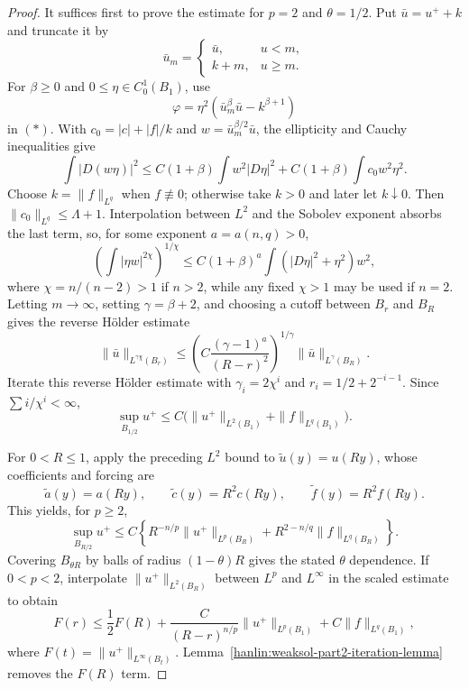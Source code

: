 \begin{proof}
\sketch It suffices first to prove the estimate for $p=2$ and
$\theta=1/2$. Put $\bar u=u^++k$ and truncate it by
\[
\bar u_m=
\begin{cases}
\bar u,&u<m,\\
k+m,&u\geq m.
\end{cases}
\]
For $\beta\geq0$ and $0\leq\eta\in C^1_0(B_1)$, use
\[
\varphi=\eta^2(\bar u_m^\beta\bar u-k^{\beta+1})
\]
in $(*)$. With $c_0=|c|+|f|/k$ and
$w=\bar u_m^{\beta/2}\bar u$, the ellipticity and Cauchy inequalities give
\[
\int|D(w\eta)|^2
\leq C(1+\beta)\int w^2|D\eta|^2
+C(1+\beta)\int c_0w^2\eta^2.
\]
Choose $k=\|f\|_{L^q}$ when $f\not\equiv0$; otherwise take $k>0$ and
later let $k\downarrow0$. Then $\|c_0\|_{L^q}\leq\Lambda+1$.
Interpolation between $L^2$ and the Sobolev exponent absorbs the last term,
so, for some exponent $a=a(n,q)>0$,
\[
\left(\int|\eta w|^{2\chi}\right)^{1/\chi}
\leq C(1+\beta)^a
\int(|D\eta|^2+\eta^2)w^2,
\]
where $\chi=n/(n-2)>1$ if $n>2$, while any fixed $\chi>1$ may be used
if $n=2$. Letting $m\to\infty$, setting $\gamma=\beta+2$, and choosing a
cutoff between $B_r$ and $B_R$ gives the reverse H\"older estimate
\begin{equation}
\|\bar u\|_{L^{\gamma\chi}(B_r)}
\leq\left(C\frac{(\gamma-1)^a}{(R-r)^2}\right)^{1/\gamma}
\|\bar u\|_{L^\gamma(B_R)}.
\end{equation}
Iterate this reverse H\"older estimate with $\gamma_i=2\chi^i$ and
$r_i=1/2+2^{-i-1}$. Since $\sum i/\chi^i<\infty$,
\begin{equation}
\sup_{B_{1/2}}u^+
\leq C\bigl(\|u^+\|_{L^2(B_1)}+\|f\|_{L^q(B_1)}\bigr).
\end{equation}

For $0<R\leq1$, apply the preceding $L^2$ bound to
$\widetilde u(y)=u(Ry)$, whose coefficients and forcing are
\[
\widetilde a(y)=a(Ry),\qquad
\widetilde c(y)=R^2c(Ry),\qquad
\widetilde f(y)=R^2f(Ry).
\]
This yields, for $p\geq2$,
\begin{equation}
\sup_{B_{R/2}}u^+
\leq C\left\{R^{-n/p}\|u^+\|_{L^p(B_R)}
+R^{2-n/q}\|f\|_{L^q(B_R)}\right\}.
\end{equation}
Covering $B_{\theta R}$ by balls of radius $(1-\theta)R$ gives the stated
$\theta$ dependence. If $0<p<2$, interpolate
$\|u^+\|_{L^2(B_R)}$ between $L^p$ and $L^\infty$ in the scaled estimate
to obtain
\[
F(r)\leq\frac12F(R)
+\frac{C}{(R-r)^{n/p}}\|u^+\|_{L^p(B_1)}
+C\|f\|_{L^q(B_1)},
\]
where $F(t)=\|u^+\|_{L^\infty(B_t)}$.
Lemma~\ref{hanlin:weaksol-part2-iteration-lemma} removes the
$F(R)$ term.
\end{proof}

